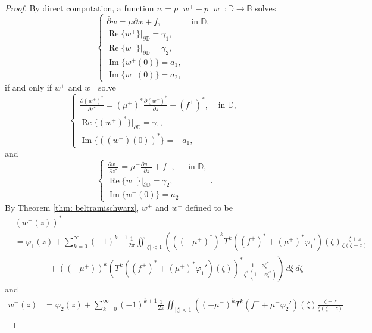 \documentclass[12pt,reqno]{amsart}
\theoremstyle{definition}
\theoremstyle{remark}
\newcommand{\p}{\partial}
\newcommand{\dbar}{\bar\partial}
\DeclareMathOperator{\im}{Im}
\DeclareMathOperator{\re}{Re}
\newcommand{\bc}{\mathbb{B}}
\newcommand{\disk}{\mathbb{D}}
\begin{document}
\begin{proof}
By direct computation, a function $w = p^+w^+ + p^- w^-:\disk\to\bc$ solves 
        \[
            \begin{cases}
                \dbar w = \mu \p w + f, & \text{ in } \disk,\\
                \re\{w^+\}|_{\p\disk} = \gamma_1, \\
                \re\{w^-\}|_{\p\disk} = \gamma_2,\\
                \im\{w^+(0)\} = a_1, \\
                \im\{w^-(0)\} = a_2,
            \end{cases}
        \]
        if and only if $w^+$ and $w^-$ solve
        \[
            \begin{cases}
                \frac{\p (w^+)^*}{\p z^*} = (\mu^+)^* \frac{\p (w^+)^*}{\p z} + (f^+)^*, & \text{ in }\disk,\\
                \re\{(w^+)^*\}|_{\p\disk} = \gamma_1,\\
                \im\{((w^+)(0))^*\} = -a_1,
            \end{cases}
        \] 
        and
        \[
            \begin{cases}
                \frac{\p w^-}{\p z^*} = \mu^- \frac{\p w^-}{\p z} + f^-, & \text{ in } \disk,\\
                \re\{w^-\}|_{\p \disk} = \gamma_2,\\
                \im\{w^-(0)\} = a_2
            \end{cases}.
        \]
        By Theorem \ref{thm: beltramischwarz}, $w^+$ and $w^-$ defined to be
        \begin{align}
            &(w^+(z))^* \label{pluseqn3}\\
            &= \varphi_1(z) 
            + \sum_{k=0}^\infty (-1)^{k+1} \frac{1}{2\pi} \iint_{|\zeta|<1} \left( ((-\mu^+)^*)^k T^k((f^+)^*+(\mu^+)^*\varphi_1')(\zeta)\frac{\zeta + z}{\zeta(\zeta -z)} \right.\label{pluseqn1}\\
            &\quad\quad\quad\quad +  \left. ((-\mu^+))^k (T^k((f^+)^*+(\mu^+)^*\varphi_1')(\zeta))^*\frac{1-z \zeta^*}{\zeta^*(1-z\zeta^*)} \right)\,d\xi\,d\zeta\label{pluseqn2}
        \end{align}
        and
        \begin{align}
            w^-(z) 
            &= \varphi_2(z) 
            + \sum_{k=0}^\infty (-1)^{k+1} \frac{1}{2\pi} \iint_{|\zeta|<1} \left( (-\mu^-)^k T^k(f^-+\mu^-\varphi_2')(\zeta)\frac{\zeta + z}{\zeta(\zeta -z)} \right.\label{minuseqn1}\\

\end{align}
\end{proof}
\end{document}
